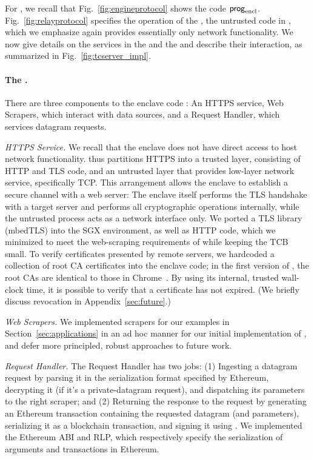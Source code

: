 For \tc, we recall that Fig.~\ref{fig:engineprotocol} shows the \encname code
${\sf prog}_{\textrm{encl}}$. Fig.~\ref{fig:relayprotocol} specifies the operation of the \medname,
the untrusted code in \tc, which we emphasize again provides essentially only
network functionality. We now give details on the services in the \encname and
the \medname and describe their interaction, as summarized in
Fig.~\ref{fig:tcserver_impl}.

\paragraph{\bf The \encname.} There are three components to the enclave code
\engine: An HTTPS service, Web Scrapers, which interact with data sources, and a
Request Handler, which services datagram requests. 

\vspace{2mm}

\noindent\emph{HTTPS Service.} We recall that the enclave does not have direct
access to host network functionality. \tc thus partitions HTTPS into a trusted
layer, consisting of HTTP and TLS code, and an untrusted layer that provides
low-layer network service, specifically TCP.  This arrangement allows the
enclave to establish a secure channel with a web server: The enclave itself
performs the TLS handshake with a target server and performs all cryptographic
operations internally, while the untrusted process acts as a network interface
only. We ported a TLS library (mbedTLS) into the SGX environment, as well as
HTTP code, which we minimized to meet the web-scraping requirements of \tc while
keeping the TCB small. To verify certificates presented by remote servers, we
hardcoded a collection of root CA certificates into the enclave code; in the
first version of \tc, the root CAs are identical to those in Chrome~\cite{}. By using its internal, trusted wall-clock time, it is possible to verify that a certificate has not expired. (We briefly discuss revocation in Appendix~\ref{sec:future}.)

\vspace{2mm}

\noindent\emph{Web Scrapers.} We implemented scrapers for our examples in Section~\ref{sec:applications} in an ad hoc manner for our initial implementation of \tc, and defer more principled, robust approaches to future work. 

\vspace{2mm}

\noindent\emph{Request Handler.} The Request Handler has two jobs: (1) Ingesting
a datagram request by parsing it in the serialization format specified by
Ethereum, decrypting it (if it's a private-datagram request), and dispatching
its parameters to the right scraper; and (2) Returning the response to the
request by generating an Ethereum transaction containing the requested datagram
(and parameters), serializing it as a blockchain transaction, and signing it
using \skTC. We implemented the Ethereum ABI and RLP, which respectively specify
the serialization of arguments and transactions in Ethereum. 

